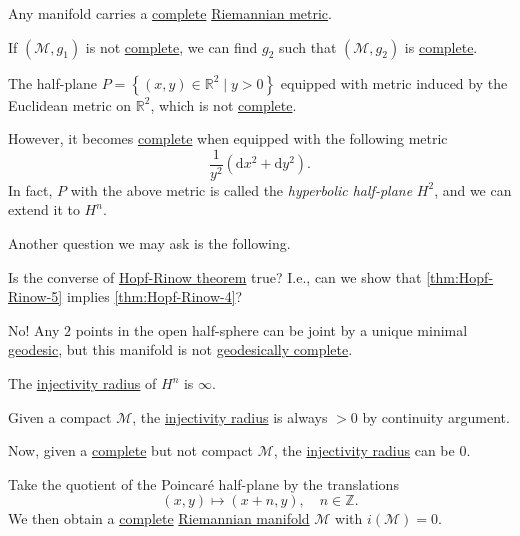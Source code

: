 Any manifold carries a \hyperref[def:geodesically-complete]{complete} \hyperref[def:Riemannian-metric]{Riemannian metric}.

If \((\mathcal{M} , g_1)\) is not \hyperref[def:geodesically-complete]{complete}, we can find \(g_2\) such that \((\mathcal{M} , g_2)\) is \hyperref[def:geodesically-complete]{complete}.

\begin{eg}
	The half-plane \(P=\left\{ (x, y)\in \mathbb{R} ^2 \mid y > 0 \right\}\) equipped with metric induced by the Euclidean metric on \(\mathbb{R} ^2\), which is not \hyperref[def:geodesically-complete]{complete}.

	However, it becomes \hyperref[def:geodesically-complete]{complete} when equipped with the following metric
	\[
		\frac{1}{y^2} (\mathrm{d} x^2 + \mathrm{d} y^2).
	\]
	In fact, \(P\) with the above metric is called the \emph{hyperbolic half-plane} \(H^2\), and we can extend it to \(H^n \).
\end{eg}

Another question we may ask is the following.

\begin{problem*}
	Is the converse of \hyperref[thm:Hopf-Rinow]{Hopf-Rinow theorem} true? I.e., can we show that \autoref{thm:Hopf-Rinow-5} implies \autoref{thm:Hopf-Rinow-4}?
\end{problem*}
\begin{answer}
	No! Any \(2\) points in the open half-sphere can be joint by a unique minimal \hyperref[def:geodesic]{geodesic}, but this manifold is not \hyperref[def:geodesically-complete]{geodesically complete}.
\end{answer}

\begin{eg}
	The \hyperref[def:injectivity-radius]{injectivity radius} of \(H^n\) is \(\infty \).
\end{eg}

\begin{remark}
	Given a compact \(\mathcal{M} \), the \hyperref[def:injectivity-radius]{injectivity radius} is always \(> 0\) by continuity argument.
\end{remark}

Now, given a \hyperref[def:geodesically-complete]{complete} but not compact \(\mathcal{M} \), the \hyperref[def:injectivity-radius]{injectivity radius} can be \(0\).

\begin{eg}
	Take the quotient of the Poincaré half-plane by the translations
	\[
		(x, y) \mapsto (x+n, y),\quad n\in \mathbb{Z} .
	\]
	We then obtain a \hyperref[def:geodesically-complete]{complete} \hyperref[def:Riemannian-manifold]{Riemannian manifold} \(\mathcal{M} \) with \(i(\mathcal{M} ) = 0\).
\end{eg}

